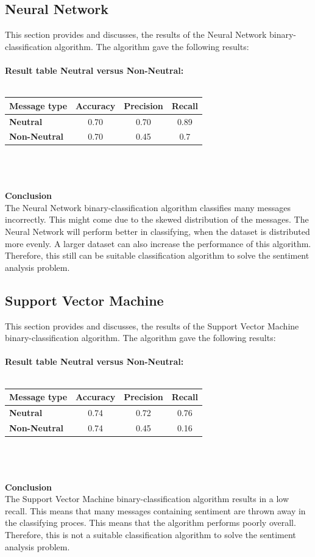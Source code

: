 \documentclass[11pt]{article}
\begin{document}
\subsection{Neural Network}
This section provides and discusses, the results of the Neural Network binary-classification algorithm. The algorithm gave the following results:\\\\
\textbf{Result table Neutral versus Non-Neutral:}\\\\
\begin{tabular}{| l || c | c | c |}
\hline
\textbf{Message type} & \textbf{Accuracy} & \textbf{Precision} & \textbf{Recall}\\
\hline \hline
\textbf{Neutral} & 0.70 & 0.70 & 0.89\\
\hline
\textbf{Non-Neutral} & 0.70 & 0.45 & 0.7\\
\hline
\end{tabular}\\\\\\
\textbf{Conclusion}\\
The Neural Network binary-classification algorithm classifies many messages incorrectly. This might come due to the skewed distribution of the messages. The Neural Network will perform better in classifying, when the dataset is distributed more evenly. A larger dataset can also increase the performance of this algorithm. Therefore, this still can be suitable classification algorithm to solve the sentiment analysis problem.

\subsection{Support Vector Machine}
This section provides and discusses, the results of the Support Vector Machine binary-classification algorithm. The algorithm gave the following results:\\\\
\textbf{Result table Neutral versus Non-Neutral:}\\\\
\begin{tabular}{| l || c | c | c |}
\hline
\textbf{Message type} & \textbf{Accuracy} & \textbf{Precision} & \textbf{Recall}\\
\hline \hline
\textbf{Neutral} & 0.74 & 0.72 & 0.76\\
\hline
\textbf{Non-Neutral} & 0.74 & 0.45 & 0.16\\
\hline
\end{tabular}\\\\\\
\textbf{Conclusion}\\
The Support Vector Machine binary-classification algorithm results in a low recall. This means that many messages containing sentiment are thrown away in the classifying proces. This means that the algorithm performs poorly overall. Therefore, this is not a suitable classification algorithm to solve the sentiment analysis problem.
\end{document}

